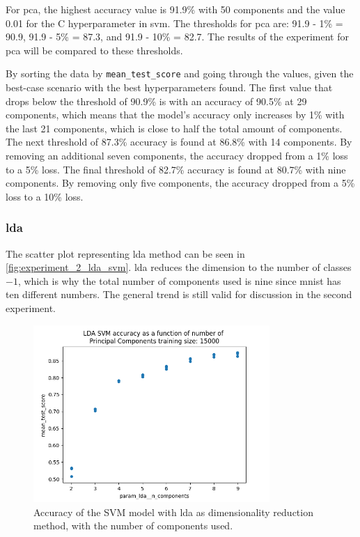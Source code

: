 For \gls{pca}, the highest accuracy value is 91.9\% with 50 components and the value 0.01 for the C hyperparameter in \gls{svm}. The thresholds for \gls{pca} are: 91.9 - 1\% = 90.9, 91.9 - 5\% = 87.3, and 91.9 - 10\% = 82.7. The results of the experiment for \gls{pca} will be compared to these thresholds.

By sorting the data by \texttt{mean\_test\_score} and going through the values, given the best-case scenario with the best hyperparameters found. The first value that drops below the threshold of 90.9\% is with an accuracy of 90.5\% at 29 components, which means that the model's accuracy only increases by 1\% with the last 21 components, which is close to half the total amount of components.
The next threshold of 87.3\% accuracy is found at 86.8\% with 14 components. By removing an additional seven components, the accuracy dropped from a 1\% loss to a 5\% loss.
The final threshold of 82.7\% accuracy is found at 80.7\% with nine components. By removing only five components, the accuracy dropped from a 5\% loss to a 10\% loss.

\subsubsection{\gls{lda}}\label{subsubsec:experiment_2_lda}
The scatter plot representing \gls{lda} method can be seen in \autoref{fig:experiment_2_lda_svm}. \gls{lda} reduces the dimension to the number of classes $-1$, which is why the total number of components used is nine since \gls{mnist} has ten different numbers. The general trend is still valid for discussion in the second experiment.


\begin{figure}[htb!]
    \centering
    \includegraphics[width=0.8\textwidth]{figures/experiment_two/lda_svm_15000.png}
    \caption{Accuracy of the SVM model with \gls{lda} as dimensionality reduction method, with the number of components used.}
    \label{fig:experiment_2_lda_svm}
\end{figure}

